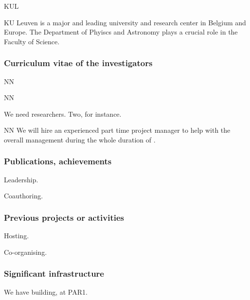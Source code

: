 \begin{sitedescription}{KUL} \label{desc:KUL}

KU Leuven is a major and leading university and research center in Belgium and Europe. The Department of Phyiscs and Astronomy plays a crucial role in the Faculty of Science.

\subsubsection*{Curriculum vitae of the investigators}




\begin{participant}[type=res,PM=48,salary=5500]{NN}
\end{participant}
\begin{participant}[type=res,PM=36,salary=5500]{NN}

We need researchers. Two, for instance.

\end{participant}

\begin{participant}[type=res,PM=24,salary=3932]{NN}
  We will hire an experienced part time project manager to help with
  the overall management during the whole duration of \TheProject.
\end{participant}

\subsubsection*{Publications, achievements}

\begin{compactenum}
\item Leadership.
\item Coauthoring.
\end{compactenum}


\subsubsection*{Previous projects or activities}

\begin{compactenum}
\item Hosting.
\item Co-organising.
\end{compactenum}

\subsubsection*{Significant infrastructure}

We have building, at PAR1.

\end{sitedescription}



